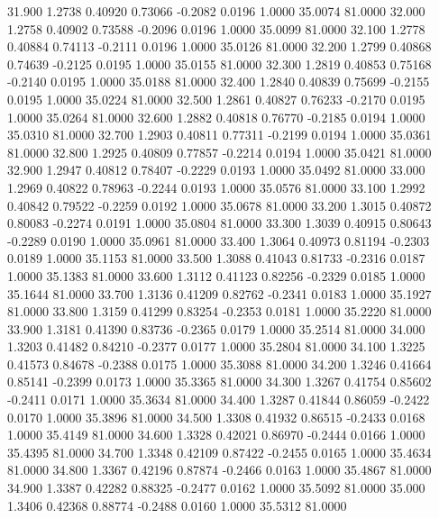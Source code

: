   31.900   1.2738   0.40920   0.73066  -0.2082   0.0196   1.0000  35.0074  81.0000
  32.000   1.2758   0.40902   0.73588  -0.2096   0.0196   1.0000  35.0099  81.0000
  32.100   1.2778   0.40884   0.74113  -0.2111   0.0196   1.0000  35.0126  81.0000
  32.200   1.2799   0.40868   0.74639  -0.2125   0.0195   1.0000  35.0155  81.0000
  32.300   1.2819   0.40853   0.75168  -0.2140   0.0195   1.0000  35.0188  81.0000
  32.400   1.2840   0.40839   0.75699  -0.2155   0.0195   1.0000  35.0224  81.0000
  32.500   1.2861   0.40827   0.76233  -0.2170   0.0195   1.0000  35.0264  81.0000
  32.600   1.2882   0.40818   0.76770  -0.2185   0.0194   1.0000  35.0310  81.0000
  32.700   1.2903   0.40811   0.77311  -0.2199   0.0194   1.0000  35.0361  81.0000
  32.800   1.2925   0.40809   0.77857  -0.2214   0.0194   1.0000  35.0421  81.0000
  32.900   1.2947   0.40812   0.78407  -0.2229   0.0193   1.0000  35.0492  81.0000
  33.000   1.2969   0.40822   0.78963  -0.2244   0.0193   1.0000  35.0576  81.0000
  33.100   1.2992   0.40842   0.79522  -0.2259   0.0192   1.0000  35.0678  81.0000
  33.200   1.3015   0.40872   0.80083  -0.2274   0.0191   1.0000  35.0804  81.0000
  33.300   1.3039   0.40915   0.80643  -0.2289   0.0190   1.0000  35.0961  81.0000
  33.400   1.3064   0.40973   0.81194  -0.2303   0.0189   1.0000  35.1153  81.0000
  33.500   1.3088   0.41043   0.81733  -0.2316   0.0187   1.0000  35.1383  81.0000
  33.600   1.3112   0.41123   0.82256  -0.2329   0.0185   1.0000  35.1644  81.0000
  33.700   1.3136   0.41209   0.82762  -0.2341   0.0183   1.0000  35.1927  81.0000
  33.800   1.3159   0.41299   0.83254  -0.2353   0.0181   1.0000  35.2220  81.0000
  33.900   1.3181   0.41390   0.83736  -0.2365   0.0179   1.0000  35.2514  81.0000
  34.000   1.3203   0.41482   0.84210  -0.2377   0.0177   1.0000  35.2804  81.0000
  34.100   1.3225   0.41573   0.84678  -0.2388   0.0175   1.0000  35.3088  81.0000
  34.200   1.3246   0.41664   0.85141  -0.2399   0.0173   1.0000  35.3365  81.0000
  34.300   1.3267   0.41754   0.85602  -0.2411   0.0171   1.0000  35.3634  81.0000
  34.400   1.3287   0.41844   0.86059  -0.2422   0.0170   1.0000  35.3896  81.0000
  34.500   1.3308   0.41932   0.86515  -0.2433   0.0168   1.0000  35.4149  81.0000
  34.600   1.3328   0.42021   0.86970  -0.2444   0.0166   1.0000  35.4395  81.0000
  34.700   1.3348   0.42109   0.87422  -0.2455   0.0165   1.0000  35.4634  81.0000
  34.800   1.3367   0.42196   0.87874  -0.2466   0.0163   1.0000  35.4867  81.0000
  34.900   1.3387   0.42282   0.88325  -0.2477   0.0162   1.0000  35.5092  81.0000
  35.000   1.3406   0.42368   0.88774  -0.2488   0.0160   1.0000  35.5312  81.0000

